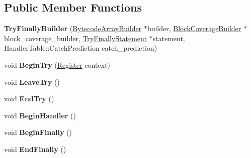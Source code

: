 \subsection*{Public Member Functions}
\begin{DoxyCompactItemize}
\item 
\mbox{\label{classv8_1_1internal_1_1interpreter_1_1TryFinallyBuilder_a77bcabdfc6a78c2e672381e76de964bb}} 
{\bfseries Try\+Finally\+Builder} (\mbox{\hyperlink{classv8_1_1internal_1_1interpreter_1_1BytecodeArrayBuilder}{Bytecode\+Array\+Builder}} $\ast$builder, \mbox{\hyperlink{classv8_1_1internal_1_1interpreter_1_1BlockCoverageBuilder}{Block\+Coverage\+Builder}} $\ast$block\+\_\+coverage\+\_\+builder, \mbox{\hyperlink{classv8_1_1internal_1_1TryFinallyStatement}{Try\+Finally\+Statement}} $\ast$statement, Handler\+Table\+::\+Catch\+Prediction catch\+\_\+prediction)
\item 
\mbox{\label{classv8_1_1internal_1_1interpreter_1_1TryFinallyBuilder_addf8f0a64110b6c5bd16a4d73a133cf3}} 
void {\bfseries Begin\+Try} (\mbox{\hyperlink{classv8_1_1internal_1_1interpreter_1_1Register}{Register}} context)
\item 
\mbox{\label{classv8_1_1internal_1_1interpreter_1_1TryFinallyBuilder_a973dd22cfc207943b678444654542a3a}} 
void {\bfseries Leave\+Try} ()
\item 
\mbox{\label{classv8_1_1internal_1_1interpreter_1_1TryFinallyBuilder_a82ec83eb8a7a9a5459798d12bd30c126}} 
void {\bfseries End\+Try} ()
\item 
\mbox{\label{classv8_1_1internal_1_1interpreter_1_1TryFinallyBuilder_a19da492591acefe3e5c0626fc7fadffe}} 
void {\bfseries Begin\+Handler} ()
\item 
\mbox{\label{classv8_1_1internal_1_1interpreter_1_1TryFinallyBuilder_a6b90023f87875bc6c84a4bc305766990}} 
void {\bfseries Begin\+Finally} ()
\item 
\mbox{\label{classv8_1_1internal_1_1interpreter_1_1TryFinallyBuilder_a343cae5354906ec289737e2b08c8e8cb}} 
void {\bfseries End\+Finally} ()
\end{DoxyCompactItemize}
